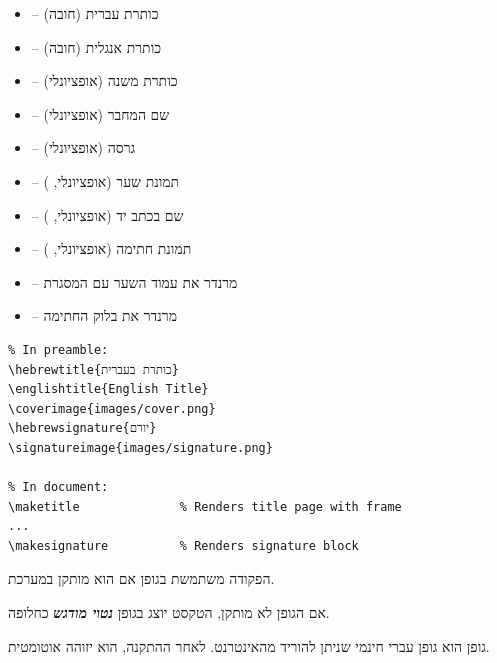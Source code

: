 \documentclass[book]{hebrew-academic-template}
\begin{document}
\begin{itemize}
    \item {} -- כותרת עברית (חובה)
    \item {} -- כותרת אנגלית (חובה)
    \item {} -- כותרת משנה (אופציונלי)
    \item {} -- שם המחבר (אופציונלי)
    \item {} -- גרסה (אופציונלי)
    \item {} -- תמונת שער (אופציונלי, )
    \item {} -- שם בכתב יד (אופציונלי, )
    \item {} -- תמונת חתימה (אופציונלי, )
\end{itemize}


\begin{itemize}
    \item {} -- מרנדר את עמוד השער עם המסגרת
    \item {} -- מרנדר את בלוק החתימה
\end{itemize}


\begin{english}
\begin{verbatim}
% In preamble:
\hebrewtitle{כותרת בעברית}
\englishtitle{English Title}
\coverimage{images/cover.png}
\hebrewsignature{יורם}
\signatureimage{images/signature.png}

% In document:
\maketitle              % Renders title page with frame
...
\makesignature          % Renders signature block
\end{verbatim}
\end{english}



הפקודה  משתמשת בגופן  אם הוא מותקן במערכת.

אם הגופן לא מותקן, הטקסט יוצג בגופן \textit{\textbf{נטוי מודגש}} כחלופה.


גופן  הוא גופן עברי חינמי שניתן להוריד מהאינטרנט. לאחר ההתקנה, הוא יזוהה אוטומטית.

\backmatter
\end{document}

